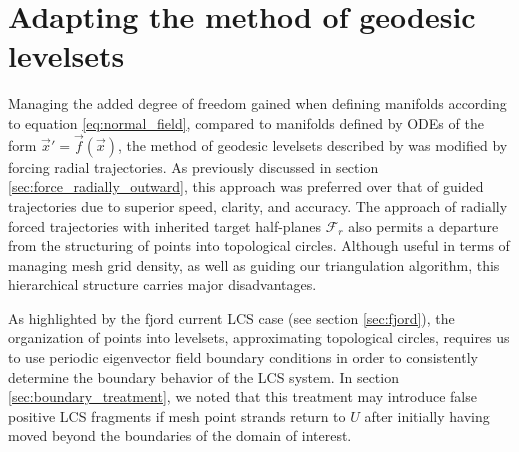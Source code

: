
\section{Adapting the method of geodesic levelsets}\label{sec:discussion_GLS}

Managing the added degree of freedom gained when defining manifolds according to equation \eqref{eq:normal_field}, compared to manifolds defined by ODEs of the form $\vec{x}'=\vec{f}(\vec{x})$, the method of geodesic levelsets described by \cite{GeodesicLevelSets} was modified by forcing radial trajectories. As previously discussed in section \ref{sec:force_radially_outward}, this approach was preferred over that of guided trajectories due to superior speed, clarity, and accuracy. The approach of radially forced trajectories with inherited target half-planes $\mathcal{F}_r$ also permits a departure from the structuring of points into topological circles. Although useful in terms of managing mesh grid density, as well as guiding our triangulation algorithm, this hierarchical structure carries major disadvantages.

As highlighted by the fjord current LCS case (see section \ref{sec:fjord}), the organization of points into levelsets, approximating topological circles, requires us to use periodic eigenvector field boundary conditions in order to consistently determine the boundary behavior of the LCS system. In section \ref{sec:boundary_treatment}, we noted that this treatment may introduce false positive LCS fragments if mesh point strands return to $U$ after initially having moved beyond the boundaries of the domain of interest.


